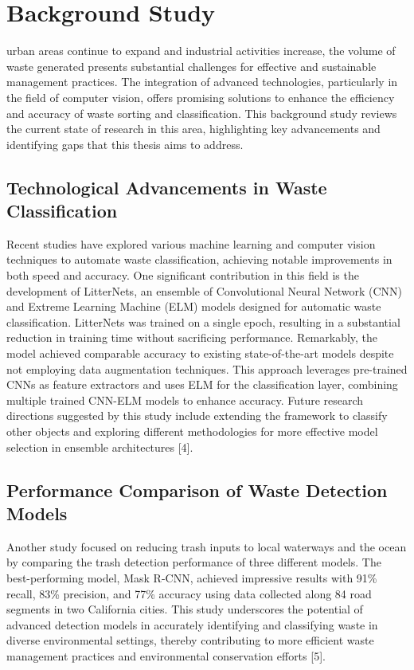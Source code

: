 \section{Background Study}
urban areas continue to expand and industrial activities increase, the volume of waste generated presents substantial challenges for effective and sustainable management practices. The integration of advanced technologies, particularly in the field of computer vision, offers promising solutions to enhance the efficiency and accuracy of waste sorting and classification. This background study reviews the current state of research in this area, highlighting key advancements and identifying gaps that this thesis aims to address.

\subsection{Technological Advancements in Waste Classification}

Recent studies have explored various machine learning and computer vision techniques to automate waste classification, achieving notable improvements in both speed and accuracy. One significant contribution in this field is the development of LitterNets, an ensemble of Convolutional Neural Network (CNN) and Extreme Learning Machine (ELM) models designed for automatic waste classification. LitterNets was trained on a single epoch, resulting in a substantial reduction in training time without sacrificing performance. Remarkably, the model achieved comparable accuracy to existing state-of-the-art models despite not employing data augmentation techniques. This approach leverages pre-trained CNNs as feature extractors and uses ELM for the classification layer, combining multiple trained CNN-ELM models to enhance accuracy. Future research directions suggested by this study include extending the framework to classify other objects and exploring different methodologies for more effective model selection in ensemble architectures [4].

\subsection{Performance Comparison of Waste Detection Models}

Another study focused on reducing trash inputs to local waterways and the ocean by comparing the trash detection performance of three different models. The best-performing model, Mask R-CNN, achieved impressive results with 91\% recall, 83\% precision, and 77\% accuracy using data collected along 84 road segments in two California cities. This study underscores the potential of advanced detection models in accurately identifying and classifying waste in diverse environmental settings, thereby contributing to more efficient waste management practices and environmental conservation efforts [5].

